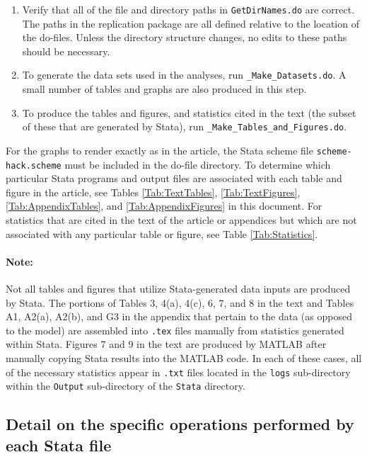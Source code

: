 \documentclass[a4,12p]{article}
\begin{document}
\begin{enumerate}

\item
Verify that all of the file and directory paths in {\tt GetDirNames.do} are correct. The paths in the replication package are all defined relative to the location of the do-files. Unless the directory structure changes, no edits to these paths should be necessary.

\item
To generate the data sets used in the analyses, run {\tt \_Make\_Datasets.do}. A small number of tables and graphs are also produced in this step.

\item
To produce the tables and figures, and statistics cited in the text (the subset of these that are generated by Stata), run {\tt \_Make\_Tables\_and\_Figures.do}. 

\end{enumerate}
%
For the graphs to render exactly as in the article, the Stata scheme file {\tt scheme-hack.scheme} must be included in the do-file directory. To determine which particular Stata programs and output files are associated with each table and figure in the article, see Tables \ref{Tab:TextTables}, \ref{Tab:TextFigures}, \ref{Tab:AppendixTables}, and \ref{Tab:AppendixFigures} in this document. For statistics that are cited in the text of the article or appendices but which are not associated with any particular table or figure, see Table \ref{Tab:Statistics}.

\paragraph{Note:} Not all tables and figures that utilize Stata-generated data inputs are produced by Stata. The portions of Tables 3, 4(a), 4(c), 6, 7, and 8 in the text and Tables A1, A2(a), A2(b), and G3 in the appendix that pertain to the data (as opposed to the model) are assembled into {\tt .tex} files manually from statistics generated within Stata. Figures 7 and 9 in the text are produced by MATLAB after manually copying Stata results into the MATLAB code. In each of these cases, all of the necessary statistics appear in {\tt .txt} files located in the {\tt logs} sub-directory within the {\tt Output} sub-directory of the {\tt Stata} directory.

\subsection{Detail on the specific operations performed by each Stata file}
\end{document}
